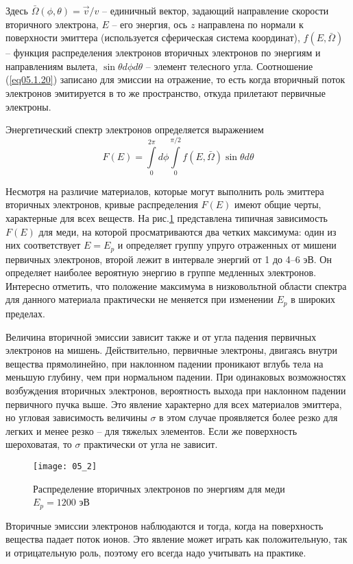 Здесь \( \bar{\Omega}(\phi,\theta) = \vec{v}/v \) -- единичный вектор, 
задающий направление скорости вторичного электрона, \( E \) -- его энергия, 
ось \( z \)  направлена по нормали к поверхности эмиттера (используется 
сферическая система координат), \( f(E,\bar{\Omega}) \) -- функция 
распределения электронов вторичных электронов по энергиям и направлениям 
вылета, \( \sin\theta d\phi d\theta \) -- элемент телесного угла. Соотношение 
(\ref{eq05.1.20}) записано для эмиссии на отражение, то есть когда вторичный 
поток электронов эмитируется в то же пространство, откуда прилетают первичные 
электроны.

Энергетический спектр электронов определяется выражением
\begin{equation}
    F(E) = \int\limits_{0}^{2\pi} d\phi 
        \int\limits_{0}^{\pi/2} f(E,\bar{\Omega}) \sin\theta d\theta
    \label{eq05.1.21}
\end{equation}

Несмотря на различие материалов, которые могут выполнить роль эмиттера 
вторичных электронов, кривые распределения \( F(E) \) имеют общие черты, 
характерные для всех веществ. На рис.\ref{img05.2} представлена типичная 
зависимость \( F(E) \) для меди, на которой просматриваются два четких 
максимума: один из них соответствует \( E = E_p \) и определяет группу упруго 
отраженных от мишени первичных электронов, второй лежит в интервале энергий от 
1 до 4–6 эВ. Он определяет наиболее вероятную энергию в группе медленных 
электронов. Интересно отметить, что положение максимума в низковольтной 
области спектра  для  данного  материала практически не меняется при изменении 
\( E_p \) в широких пределах.

Величина вторичной эмиссии зависит также и от угла падения первичных 
электронов на мишень. Действительно, первичные электроны, двигаясь внутри 
вещества прямолинейно, при наклонном падении проникают вглубь тела на меньшую 
глубину, чем при нормальном падении. При одинаковых возможностях возбуждения 
вторичных электронов, вероятность выхода при наклонном падении первичного 
пучка выше. Это явление характерно для всех материалов эмиттера, но угловая 
зависимость величины \( \sigma \) в этом случае проявляется более резко для 
легких и менее резко -- для тяжелых элементов. Если же поверхность 
шероховатая, то \( \sigma \) практически от угла не зависит.
\begin{figure}[h]
    \center
    \texttt{[image: 05\_2]}
    \caption{Распределение вторичных электронов по энергиям для меди 
        \( E_p = 1200 \) эВ}
    \label{img05.2}
\end{figure}

Вторичные эмиссии электронов наблюдаются и тогда, когда на поверхность 
вещества падает поток ионов. Это явление может играть как положительную, так 
и отрицательную роль, поэтому его всегда надо учитывать на практике.
